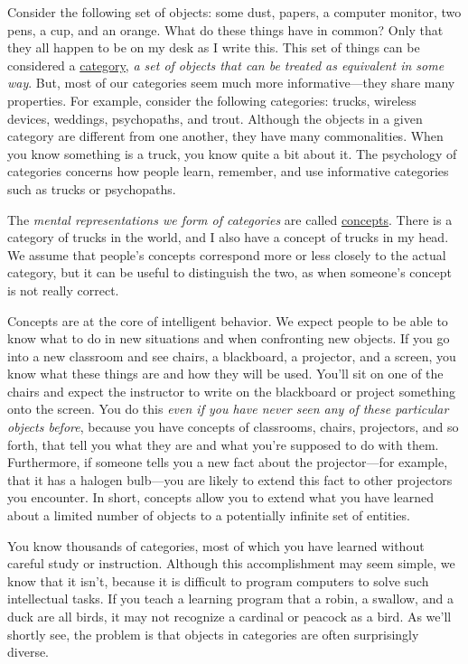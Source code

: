 \documentclass[
]{krantz}
\begin{document}
Consider the following set of objects: some dust, papers, a computer monitor, two pens, a cup, and an orange. What do these things have in common? Only that they all happen to be on my desk as I write this. This set of things can be considered a \protect\hyperlink{category}{category}, \emph{a set of objects that can be treated as equivalent in some way}. But, most of our categories seem much more informative---they share many properties. For example, consider the following categories: trucks, wireless devices, weddings, psychopaths, and trout. Although the objects in a given category are different from one another, they have many commonalities. When you know something is a truck, you know quite a bit about it. The psychology of categories concerns how people learn, remember, and use informative categories such as trucks or psychopaths.

The \emph{mental representations we form of categories} are called \href{concept}{concepts}. There is a category of trucks in the world, and I also have a concept of trucks in my head. We assume that people's concepts correspond more or less closely to the actual category, but it can be useful to distinguish the two, as when someone's concept is not really correct.

Concepts are at the core of intelligent behavior. We expect people to be able to know what to do in new situations and when confronting new objects. If you go into a new classroom and see chairs, a blackboard, a projector, and a screen, you know what these things are and how they will be used. You'll sit on one of the chairs and expect the instructor to write on the blackboard or project something onto the screen. You do this \emph{even if you have never seen any of these particular objects before}, because you have concepts of classrooms, chairs, projectors, and so forth, that tell you what they are and what you're supposed to do with them. Furthermore, if someone tells you a new fact about the projector---for example, that it has a halogen bulb---you are likely to extend this fact to other projectors you encounter. In short, concepts allow you to extend what you have learned about a limited number of objects to a potentially infinite set of entities.

You know thousands of categories, most of which you have learned without careful study or instruction. Although this accomplishment may seem simple, we know that it isn't, because it is difficult to program computers to solve such intellectual tasks. If you teach a learning program that a robin, a swallow, and a duck are all birds, it may not recognize a cardinal or peacock as a bird. As we'll shortly see, the problem is that objects in categories are often surprisingly diverse.
\end{document}
